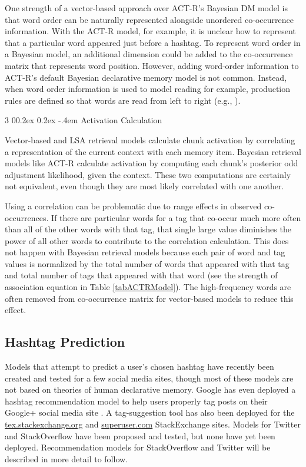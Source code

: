 \documentclass[man,floatsintext,donotrepeattitle]{apa6}
\makeatletter
\renewcommand{\subsubsection}{%
  \@startsection
  {subsubsection}%
  {3}%
  {\parindent}%
  {0\baselineskip \@plus 0.2ex \@minus 0.2ex}%
  {-.4em}%
  {\normalfont\normalsize\bfseries\addperi}}
\makeatother
\begin{document}
One strength of a vector-based approach over ACT-R's Bayesian DM model is that word order can be naturally represented alongside unordered co-occurrence information.
With the ACT-R model, for example, it is unclear how to represent that a particular word appeared just before a hashtag. 
To represent word order in a Bayesian model, an additional dimension could be added to the co-occurrence matrix that represents word position.
However, adding word-order information to ACT-R's default Bayesian declarative memory model is not common.
Instead, when word order information is used to model reading for example, production rules are defined so that words are read from left to right (e.g., \textcite{Lewis2006}).

\subsubsection{Activation Calculation}

Vector-based and LSA retrieval models calculate chunk activation by correlating a representation of the current context with each memory item.
Bayesian retrieval models like ACT-R calculate activation by computing each chunk's posterior odd adjustment likelihood, given the context.
These two computations are certainly not equivalent, even though they are most likely correlated with one another.

Using a correlation can be problematic due to range effects in observed co-occurrences.
If there are particular words for a tag that co-occur much more often than all of the other words with that tag, that single large value diminishes the power of all other words to contribute to the correlation calculation.
This does not happen with Bayesian retrieval models because each pair of word and tag values is normalized by the total number of words that appeared with that tag and total number of tags that appeared with that word
(see the strength of association equation in Table \ref{tabACTRModel}).
The high-frequency words are often removed from co-occurrence matrix for vector-based models to reduce this effect.

\subsection{Hashtag Prediction}

Models that attempt to predict a user's chosen hashtag have recently been created and tested for a few social media sites,
though most of these models are not based on theories of human declarative memory.
Google has even deployed a hashtag recommendation model to help users properly tag posts on their Google+ social media site \parencite{GoogleKeynote2013}.
A tag-suggestion tool has also been deployed for the \url{tex.stackexchange.org} and \url{superuser.com} StackExchange sites.
Models for Twitter and StackOverflow have been proposed and tested, but none have yet been deployed.
Recommendation models for StackOverflow and Twitter will be described in more detail to follow.
\end{document}
